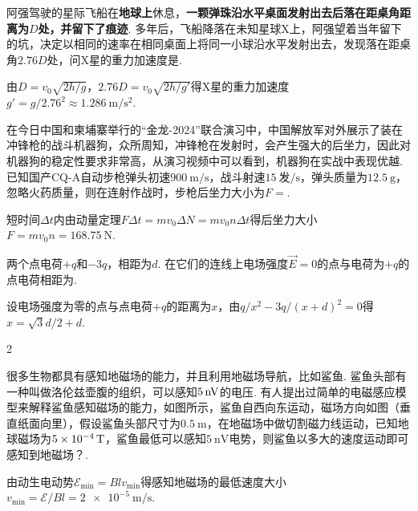 \documentclass[quiet, fontset = fandol, AutoFakeSlant, 10pt]{ctexart}
\let \emph \textbf
\begin{document}
\begin{problem}[本题3分]
    阿强驾驶的星际飞船在\emph{地球上}休息，\emph{一颗弹珠沿水平桌面发射出去后落在距桌角距离为$D$处，并留下了痕迹}. 多年后，飞船降落在未知星球X上，阿强望着当年留下的坑，决定以相同的速率在相同桌面上将同一小球沿水平发射出去，发现落在距桌角$2.76D$处，问X星的重力加速度是.
\end{problem}
\begin{solution}
    由$D=v_0\sqrt{2h/g}$，$2.76D=v_0\sqrt{2h/g'}$得X星的重力加速度$g'=g/2.76^2\approx\qty{1.286}{\m/\s^2}$.
\end{solution}

\begin{problem}[本题3分]
    在今日中国和柬埔寨举行的``金龙-2024''联合演习中，中国解放军对外展示了装在冲锋枪的战斗机器狗，众所周知，冲锋枪在发射时，会产生强大的后坐力，因此对机器狗的稳定性要求非常高，从演习视频中可以看到，机器狗在实战中表现优越. 已知国产CQ-A自动步枪弹头初速$\qty{900}{\m/\s}$，战斗射速$\qty{15}{\text{发}/\s}$，弹头质量为$\qty{12.5}\g$，忽略火药质量，则在连射作战时，步枪后坐力大小为$F=$.
\end{problem}
\begin{solution}
    短时间$\Delta t$内由动量定理$F\Delta t=mv_0\Delta N=mv_0n\Delta t$得后坐力大小$F=mv_0n=\qty{168.75}\N$.
\end{solution}

\begin{problem}[本题3分]
    两个点电荷$+q$和$-3q$，相距为$d$. 在它们的连线上电场强度$\vec E=0$的点与电荷为$+q$的点电荷相距为.
\end{problem}
\begin{solution}
    设电场强度为零的点与点电荷$+q$的距离为$x$，由$q/x^2-3q/(x+d)^2=0$得$x=\sqrt3d/2+d$.
\end{solution}

\begin{paracol}{2}
\begin{problem}[本题3分]
    很多生物都具有感知地磁场的能力，并且利用地磁场导航，比如鲨鱼. 鲨鱼头部有一种叫做洛伦兹壶腹的组织，可以感知$\qty5\nV$的电压. 有人提出过简单的电磁感应模型来解释鲨鱼感知磁场的能力，如图所示，鲨鱼自西向东运动，磁场方向如图（垂直纸面向里），假设鲨鱼头部尺寸为$\qty{0.5}\m$，在地磁场中做切割磁力线运动，已知地球磁场为$\qty{5e-4}\T$，鲨鱼最低可以感知$\qty{5}\nV$电势，则鲨鱼以多大的速度运动即可感知到地磁场？.
    \switchcolumn\vspace*{\fill}
    \centering
    \vspace*{\fill}
\end{problem}
\end{paracol}
\begin{solution}
    由动生电动势$\mathscr E_{\min}=Blv_{\min}$得感知地磁场的最低速度大小$v_{\min}=\mathscr E/Bl=\qty{2e-5}{\m/\s}$.
\end{solution}
\end{document}
